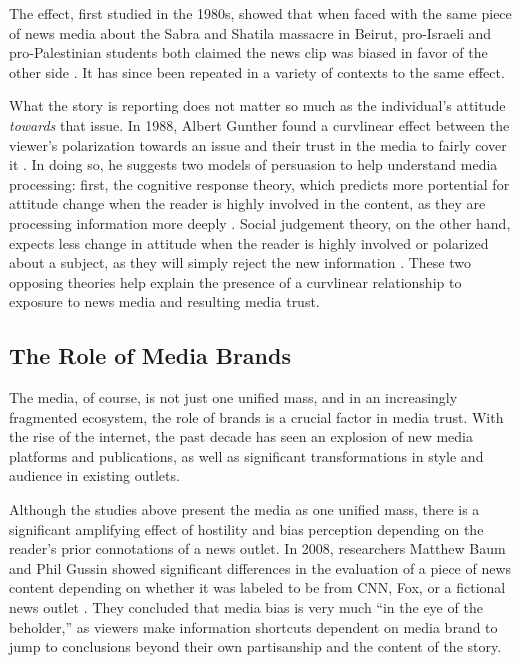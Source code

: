 The effect, first studied in the 1980s, showed that when faced with the same piece of news media about the Sabra and Shatila massacre in Beirut, pro-Israeli and pro-Palestinian students both claimed the news clip was biased in favor of the other side 
 \cite{vallone1985hostile}. It has since been repeated in a variety of contexts to the same effect.

What the story is reporting does not matter so much as the individual's attitude \emph{towards} that issue. In 1988, Albert Gunther found a curvlinear effect between the viewer's polarization towards an issue and their trust in the media to fairly cover it \cite{gunther1988attitude}. In doing so, he suggests two models of persuasion to help understand media processing: first, the cognitive response theory, which predicts more portential for attitude change when the reader is highly involved in the content, as they are processing information more deeply \cite{cacioppo1979effects}. Social judgement theory, on the other hand, expects less change in attitude when the reader is highly involved or polarized about a subject, as they will simply reject the new information \cite{sherif1961social}. These two opposing theories help explain the presence of a curvlinear relationship to exposure to news media and resulting media trust.

 

\subsection{The Role of Media Brands}

The media, of course, is not just one unified mass, and in an increasingly fragmented ecosystem, the role of brands is a crucial factor in media trust. With the rise of the internet, the past decade has seen an explosion of new media platforms and publications, as well as significant transformations in style and audience in existing outlets.

Although the studies above present the media as one unified mass, there is a significant amplifying effect of hostility and bias perception depending on the reader's prior connotations of a news outlet. In 2008, researchers Matthew Baum and Phil Gussin showed significant differences in the evaluation of a piece of news content depending on whether it was labeled to be from CNN, Fox, or a fictional news outlet \cite{baum2008eye}. They concluded that media bias is very much ``in the eye of the beholder,'' as viewers make information shortcuts dependent on media brand to jump to conclusions beyond their own partisanship and the content of the story. 

